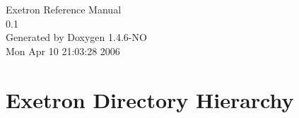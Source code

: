 \documentclass[a4paper]{book}
\begin{document}
\begin{titlepage}
\vspace*{7cm}
\begin{center}
{\Large Exetron Reference Manual\\[1ex]\large 0.1 }\\
\vspace*{1cm}
{\large Generated by Doxygen 1.4.6-NO}\\
\vspace*{0.5cm}
{\small Mon Apr 10 21:03:28 2006}\\
\end{center}
\end{titlepage}
\clearemptydoublepage
{}
\tableofcontents
\clearemptydoublepage
{}
\chapter{Exetron Directory Hierarchy}

\end{document}

